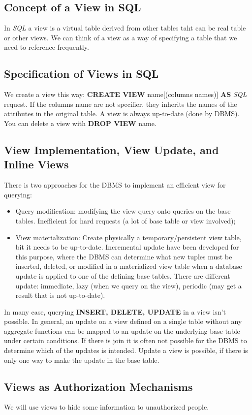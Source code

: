 \subsection{Concept of a View in SQL}
In \textit{SQL} a view is a virtual table derived from other tables taht can be real table or other views.
We can think of a view as a way of specifying a table that we need to reference frequently.

\subsection{Specification of Views in SQL}
We create a view this way: \textbf{CREATE VIEW} name[(columns names)] \textbf{AS} \textit{SQL} request. If the columns name are not specifier, they inherits the names of the attributes in the original table. A view is always up-to-date (done by DBMS). You can delete a view with \textbf{DROP VIEW} name.

\subsection{View Implementation, View Update, and Inline Views}
There is two approaches for the DBMS to implement an efficient view for querying:
\begin{itemize}
\item Query modification: modifying the view query onto queries on the base tables. Inefficient for hard requests (a lot of base table or view involved);
\item View materialization: Create physically a temporary/persistent view table, bit it needs to be up-to-date. Incremental update have been developed for this purpose, where the DBMS can determine what new tuples must be inserted, deleted, or modified in a materialized view table when a database update is applied to one of the defining base tables. There are different update: immediate, lazy (when we query on the view), periodic (may get a result that is not up-to-date).
\end{itemize}
In many case, querying \textbf{INSERT, DELETE, UPDATE} in a view isn't possible. In general, an update on a view defined on a single table without any aggregate functions can be mapped to an update on the underlying base table under certain conditions. If there is join it is often not possible for the DBMS to determine which of the updates is intended. Update a view is possible, if there is only one way to make the update in the base table.

\subsection{Views as Authorization Mechanisms}
We will use views to hide some information to unauthorized people. 

